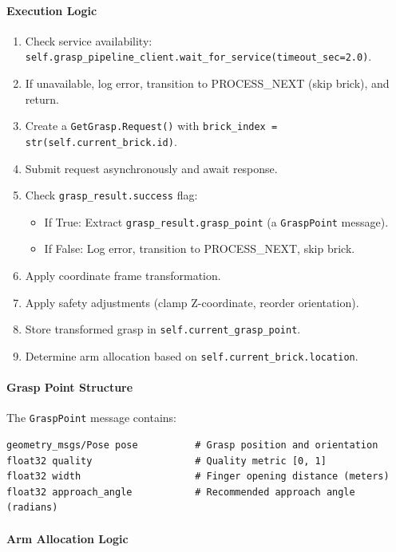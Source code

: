 \paragraph{Execution Logic}

\begin{enumerate}
    \item Check service availability: \texttt{self.grasp\_pipeline\_client.wait\_for\_service(timeout\_sec=2.0)}.
    \item If unavailable, log error, transition to PROCESS\_NEXT (skip brick), and return.
    \item Create a \texttt{GetGrasp.Request()} with \texttt{brick\_index = str(self.current\_brick.id)}.
    \item Submit request asynchronously and await response.
    \item Check \texttt{grasp\_result.success} flag:
    \begin{itemize}
        \item If True: Extract \texttt{grasp\_result.grasp\_point} (a \texttt{GraspPoint} message).
        \item If False: Log error, transition to PROCESS\_NEXT, skip brick.
    \end{itemize}
    \item Apply coordinate frame transformation.
    \item Apply safety adjustments (clamp Z-coordinate, reorder orientation).
    \item Store transformed grasp in \texttt{self.current\_grasp\_point}.
    \item Determine arm allocation based on \texttt{self.current\_brick.location}.
\end{enumerate}

\paragraph{Grasp Point Structure}

The \texttt{GraspPoint} message contains:
\begin{verbatim}
geometry_msgs/Pose pose          # Grasp position and orientation
float32 quality                  # Quality metric [0, 1]
float32 width                    # Finger opening distance (meters)
float32 approach_angle           # Recommended approach angle (radians)
\end{verbatim}

\paragraph{Arm Allocation Logic}

